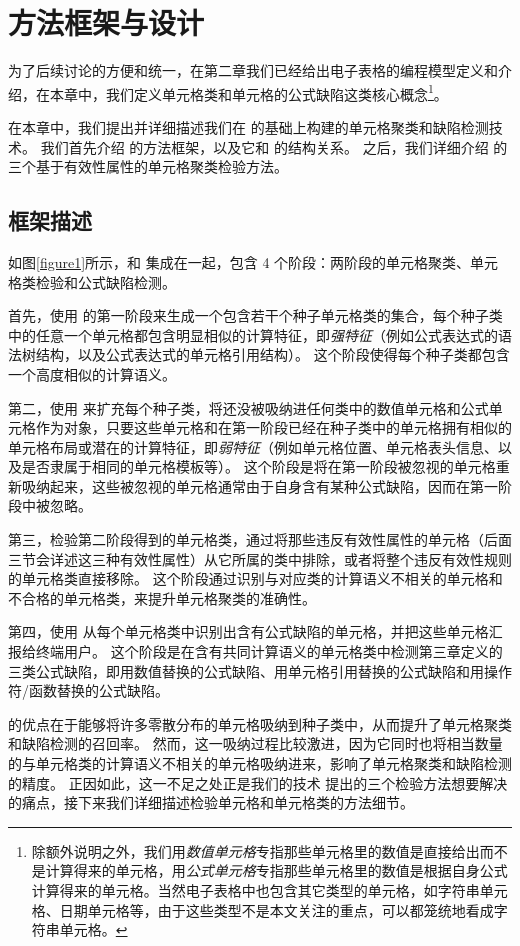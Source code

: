 \chapter{方法框架与设计}
为了后续讨论的方便和统一，在第二章我们已经给出电子表格的编程模型定义和介绍，在本章中，我们定义单元格类和单元格的公式缺陷这类核心概念\footnote{除额外说明之外，我们用\textit{数值单元格}专指那些单元格里的数值是直接给出而不是计算得来的单元格，用\textit{公式单元格}专指那些单元格里的数值是根据自身公式计算得来的单元格。当然电子表格中也包含其它类型的单元格，如字符串单元格、日期单元格等，由于这些类型不是本文关注的重点，可以都笼统地看成字符串单元格。}。

在本章中，我们提出并详细描述我们在 \cu 的基础上构建的单元格聚类和缺陷检测技术\wa 。
我们首先介绍 \wa 的方法框架，以及它和 \cu 的结构关系。
之后，我们详细介绍 \wa 的三个基于有效性属性的单元格聚类检验方法。

\section{框架描述}
如图\ref{figure1}所示，\wa 和 \cu 集成在一起，包含 4 个阶段：两阶段的单元格聚类、单元格类检验和公式缺陷检测。

首先，\wa 使用 \cu 的第一阶段来生成一个包含若干个种子单元格类的集合，每个种子类中的任意一个单元格都包含明显相似的计算特征，即\textit{强特征}（例如公式表达式的语法树结构，以及公式表达式的单元格引用结构）。
这个阶段使得每个种子类都包含一个高度相似的计算语义。

第二，\wa 使用 \cu 来扩充每个种子类，将还没被吸纳进任何类中的数值单元格和公式单元格作为对象，只要这些单元格和在第一阶段已经在种子类中的单元格拥有相似的单元格布局或潜在的计算特征，即\textit{弱特征}（例如单元格位置、单元格表头信息、以及是否隶属于相同的单元格模板等）。
这个阶段是将在第一阶段被忽视的单元格重新吸纳起来，这些被忽视的单元格通常由于自身含有某种公式缺陷，因而在第一阶段中被忽略。

第三，\wa 检验第二阶段得到的单元格类，通过将那些违反有效性属性的单元格（后面三节会详述这三种有效性属性）从它所属的类中排除，或者将整个违反有效性规则的单元格类直接移除。
这个阶段通过识别与对应类的计算语义不相关的单元格和不合格的单元格类，来提升单元格聚类的准确性。

第四，\wa 使用 \cu 从每个单元格类中识别出含有公式缺陷的单元格，并把这些单元格汇报给终端用户。
这个阶段是在含有共同计算语义的单元格类中检测第三章定义的三类公式缺陷，即用数值替换的公式缺陷、用单元格引用替换的公式缺陷和用操作符/函数替换的公式缺陷。

\cu 的优点在于能够将许多零散分布的单元格吸纳到种子类中，从而提升了单元格聚类和缺陷检测的召回率\cite{cheung2016custodes}。
然而，这一吸纳过程比较激进，因为它同时也将相当数量的与单元格类的计算语义不相关的单元格吸纳进来，影响了单元格聚类和缺陷检测的精度。
正因如此，这一不足之处正是我们的技术 \wa 提出的三个检验方法想要解决的痛点，接下来我们详细描述检验单元格和单元格类的方法细节。


